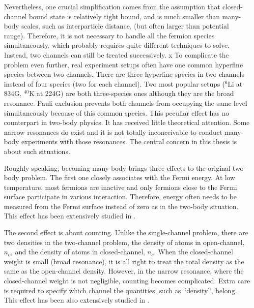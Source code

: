   Nevertheless, one crucial simplification comes from  the assumption that closed-channel bound state is relatively tight bound, and is much smaller than  many-body scales, such as interparticle distance, (but often larger than potential range).  Therefore, it is not necessary to handle all the  fermion species simultaneously, which probably requires quite different techniques to solve. Instead, two channels can still be treated successively. 
x
To complicate the problem even further,  real experiment setups often have one common hyperfine species between two channels. There are three hyperfine species in two channels instead of four species (two for each channel).  Two most popular setups (${}^{6}\text{Li}$ at 834G, $^{40}\text{K}$ at 224G) are both three-species ones although they are the broad resonance.  Pauli exclusion prevents  both channels from occupying the same level simultaneously because of this common species.  This peculiar effect has no counterpart in two-body physics. It has  received little theoretical attention.    Some  narrow resonances do exist \cite{ChinRMP} and it is not totally inconceivable to conduct many-body experiments with those resonances.  The central concern in this thesis is about such situations. 

Roughly speaking, becoming many-body brings three effects to the original two-body problem.  The first one closely associates with the Fermi energy.  At low temperature, most fermions are inactive and only fermions close to the Fermi surface participate in various interaction. Therefore, energy often needs to be measured from the Fermi surface instead of zero as in the two-body situation.  This effect has been extensively studied in \cite{GurarieNarrow}.

The second effect is about counting. Unlike the single-channel problem, there are two densities in the two-channel problem, the density of atoms in open-channel, $n_{o}$, and the density of atoms in closed-channel, $n_{c}$. When the closed-channel weight is small (broad resonance), it is all right to treat the total density as the same as the open-channel density.  However, in the narrow resonance, where the closed-channel weight is not negligible, counting becomes complicated.  Extra care is required to specify which channel the  quantities, such as ``density'', belong.  This effect has been  also extensively studied in \cite{GurarieNarrow}.

